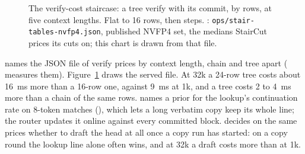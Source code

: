 \begin{figure}[htbp]
\centering
{}
\caption[Verify cost against tree rows]{The verify-cost staircase: a tree verify with its commit, by rows, at five context lengths. Flat to 16 rows, then steps. \measured: \texttt{ops/stair-tables-nvfp4.json}, published NVFP4 set, the medians StairCut prices its cuts on; this chart is drawn from that file.}\label{fig:verify-cost}
\end{figure}

 names the JSON file of verify prices by context length, chain and tree apart ( measures them). Figure~\ref{fig:verify-cost} draws the served file. At 32k a 24-row tree costs about 16~ms more than a 16-row one, against 9~ms at 1k, and a tree costs 2 to 4~ms more than a chain of the same rows.  names a prior for the lookup's continuation rate on 8-token matches (), which lets a long verbatim copy keep its whole line; the router updates it online against every committed block.  decides on the same prices whether to draft the head at all once a copy run has started: on a copy round the lookup line alone often wins, and at 32k a draft costs more than at 1k.

